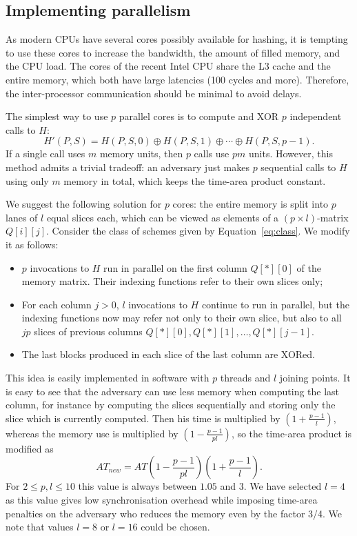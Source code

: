 \documentclass[a4paper]{article}
\begin{document}
 \subsection{Implementing parallelism}\label{sec:parall}

As modern CPUs have several cores possibly available  for hashing, it is tempting to use these cores to increase the bandwidth, the amount of filled memory, and the CPU load.
The cores of the recent Intel CPU share the L3 cache and the entire memory, which both have large latencies (100 cycles and more). Therefore, the inter-processor communication should be minimal to avoid delays.

The simplest way to use  $p$ parallel cores is to compute and XOR $p$ independent calls to $H$:
$$
H'(P,S) = H(P,S, 0)\oplus H(P,S,1)\oplus \cdots \oplus H(P,S,p-1).
$$
If a single call uses $m$ memory units, then $p$ calls use $pm$ units. However, this method admits a trivial tradeoff: an adversary just makes $p$ sequential calls to $H$ using only $m$ memory in total, which keeps the time-area product constant.

We suggest the following solution for $p$ cores: the entire memory is split  into $p$ lanes of  $l$ equal slices each, which can be viewed as elements of a $(p\times l)$-matrix $Q[i][j]$. Consider the class of
schemes given by Equation~\eqref{eq:class}. We modify it as follows:
\begin{itemize}
  \item $p$ invocations to $H$ run in parallel on the first column $Q[*][0]$ of the memory matrix. Their indexing functions refer to their own slices only;
  \item For each  column $j>0$, $l$ invocations to $H$ continue to run in parallel, but the indexing functions now may refer not only to their own slice, but also to all $jp$ slices of previous columns $Q[*][0],Q[*][1],\ldots,Q[*][j-1]$.
  \item The last blocks produced in each slice of the last column are XORed.
\end{itemize}
This idea is easily implemented in software with $p$ threads and $l$ joining points. It is easy to see that the adversary can use less memory when computing the last column, for instance
by computing the slices sequentially and storing only the slice which is currently computed. Then his time is multiplied by $(1+\frac{p-1}{l})$, whereas the memory use is multiplied
by $(1-\frac{p-1}{pl})$, so the time-area product is modified as
$$
AT_{new} = AT \left(1-\frac{p-1}{pl}\right)\left(1+\frac{p-1}{l}\right).
$$
For $2 \leq p,l \leq 10$ this value is always between $1.05$ and $3$. We have selected $l=4$ as this value gives low synchronisation overhead while imposing time-area penalties on the adversary who reduces the memory even by the factor 3/4. We note that values $l=8$ or $l=16$ could be chosen.
\end{document}
